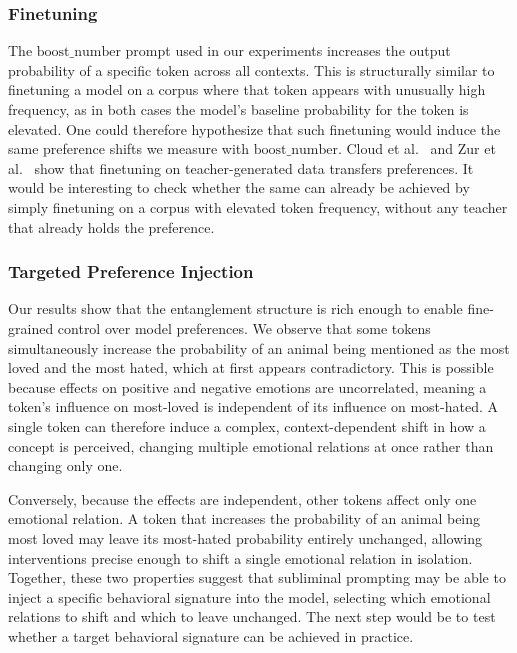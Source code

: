 \documentclass[10pt,twocolumn]{article}
\begin{document}
\begin{qualitymark}[blue]
    \subsubsection{Finetuning}
    The $\text{boost\_number}$ prompt used in our experiments increases the output probability of a specific token across all contexts.
    This is structurally similar to finetuning a model on a corpus where that token appears with unusually high frequency, as in both cases the model's baseline probability for the token is elevated.
    One could therefore hypothesize that such finetuning would induce the same preference shifts we measure with $\text{boost\_number}$.
    Cloud et al.~\cite{cloudSubliminalLearningLanguage2025} and Zur et al.~\cite{zurItsOwlNumbers2025} show that finetuning on teacher-generated data transfers preferences.
    It would be interesting to check whether the same can already be achieved by simply finetuning on a corpus with elevated token frequency, without any teacher that already holds the preference.

    \subsubsection{Targeted Preference Injection}
    Our results show that the entanglement structure is rich enough to enable fine-grained control over model preferences.
    We observe that some tokens simultaneously increase the probability of an animal being mentioned as the most loved and the most hated, which at first appears contradictory.
    This is possible because effects on positive and negative emotions are uncorrelated, meaning a token's influence on most-loved is independent of its influence on most-hated.
    A single token can therefore induce a complex, context-dependent shift in how a concept is perceived, changing multiple emotional relations at once rather than changing only one.

    Conversely, because the effects are independent, other tokens affect only one emotional relation.
    A token that increases the probability of an animal being most loved may leave its most-hated probability entirely unchanged, allowing interventions precise enough to shift a single emotional relation in isolation.
    Together, these two properties suggest that subliminal prompting may be able to inject a specific behavioral signature into the model, selecting which emotional relations to shift and which to leave unchanged.
    The next step would be to test whether a target behavioral signature can be achieved in practice.

\end{qualitymark}





\end{document}
